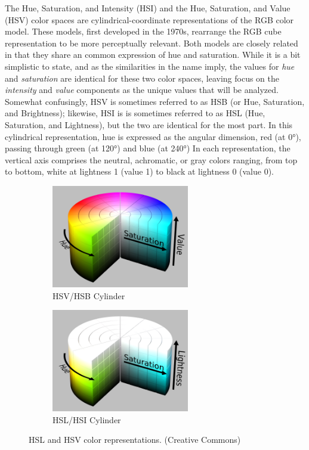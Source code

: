 \documentclass[letterpaper]{report}
\begin{document}
The Hue, Saturation, and Intensity (HSI) and the Hue, Saturation, and Value (HSV) color spaces are cylindrical-coordinate representations of the RGB color model.  These models, first developed in the 1970s, rearrange the RGB cube representation to be more perceptually relevant. Both models are closely related in that they share an common expression of hue and saturation. While it is a bit simplistic to state, and as the similarities in the name imply, the values for \textit{hue} and \textit{saturation} are identical for these two color spaces, leaving focus on the \textit{intensity} and \textit{value} components as the unique values that will be analyzed. \parencite[p.~84]{Forsyth2012-hy} Somewhat confusingly, HSV is sometimes referred to as HSB (or Hue, Saturation, and Brightness); likewise, HSI is  is sometimes referred to as HSL (Hue, Saturation, and Lightness), but the two are identical for the most part. In this cylindrical representation, hue is expressed as the angular dimension, red (at 0\si{\degree}), passing through green (at 120\si{\degree}) and blue (at 240\si{\degree}) In each representation, the vertical axis comprises the neutral, achromatic, or gray colors ranging, from top to bottom, white at lightness 1 (value 1) to black at lightness 0 (value 0).

\begin{figure}[H]
	\centering
	\begin{subfigure}[h]{.45\textwidth}
		\centering
		\includegraphics[width=6cm]{./figures/HSV_color_solid_cylinder_saturation_gray.png}
		\caption{HSV/HSB Cylinder}
		\label{fig:hsv}
	\end{subfigure}
	\hfill
	\begin{subfigure}[h]{.45\textwidth}
		\centering
		\includegraphics[width=6cm]{./figures/HSL_color_solid_cylinder_saturation_gray.png}
		\caption{HSL/HSI Cylinder}
		\label{fig:hsl}
	\end{subfigure}
	\caption[HSL and HSV color representations]{HSL and HSV color representations. (Creative Commons)}
	\label{fig:overlap}
\end{figure}
\end{document}
